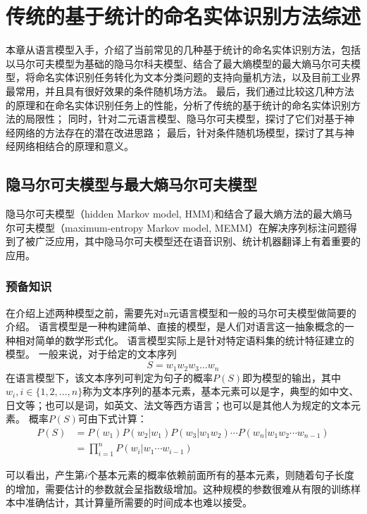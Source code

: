 \chapter{传统的基于统计的命名实体识别方法综述}
本章从语言模型入手，介绍了当前常见的几种基于统计的命名实体识别方法，包括以马尔可夫模型为基础的隐马尔科夫模型、结合了最大熵模型的最大熵马尔可夫模型，将命名实体识别任务转化为文本分类问题的支持向量机方法，以及目前工业界最常用，并且具有很好效果的条件随机场方法。
最后，我们通过比较这几种方法的原理和在命名实体识别任务上的性能，分析了传统的基于统计的命名实体识别方法的局限性；
同时，针对二元语言模型、隐马尔可夫模型，探讨了它们对基于神经网络的方法存在的潜在改进思路；
最后，针对条件随机场模型，探讨了其与神经网络相结合的原理和意义。
\section{隐马尔可夫模型与最大熵马尔可夫模型}
隐马尔可夫模型（hidden Markov model, HMM)和结合了最大熵方法的最大熵马尔可夫模型（maximum-entropy Markov model, MEMM）在解决序列标注问题得到了被广泛应用，其中隐马尔可夫模型还在语音识别、统计机器翻译上有着重要的应用。
\subsection{预备知识}
在介绍上述两种模型之前，需要先对n元语言模型和一般的马尔可夫模型做简要的介绍。
语言模型是一种构建简单、直接的模型，是人们对语言这一抽象概念的一种相对简单的数学形式化。
语言模型实际上是针对特定语料集的统计特征建立的模型。
一般来说，对于给定的文本序列
\begin{equation}
    S = w_1 w_2 w_3 \dots w_n
\end{equation}
在语言模型下，该文本序列可判定为句子的概率$P(S)$即为模型的输出，其中$w_i, i\in \{1,2,\dots,n\}$称为文本序列的基本元素，基本元素可以是字，典型的如中文、日文等；也可以是词，如英文、法文等西方语言；也可以是其他人为规定的文本元素。
概率$P(S)$可由下式计算：
\begin{align}
    \label{eq: language model} P(S) &= P(w_1)P(w_2 | w_1)P(w_3 | w_1 w_2)\cdots P(w_n | w_1 w_2 \cdots w_{n-1})\\
    &= \prod_{i=1}^{n}P(w_i | w_1 \cdots w_{i-1})
\end{align}

可以看出，产生第$i$个基本元素的概率依赖前面所有的基本元素，则随着句子长度的增加，需要估计的参数就会呈指数级增加。这种规模的参数很难从有限的训练样本中准确估计，其计算量所需要的时间成本也难以接受。

